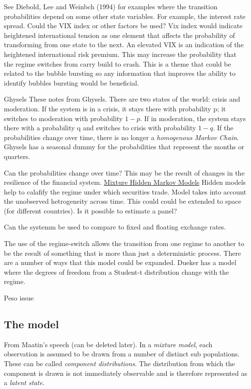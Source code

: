 \documentclass[12pt, a4paper, oneside]{article} %
\begin{document}
See Diebold, Lee and Weinbch (1994) for examples where the transition probabilities depend on some other state variables.  For example, the interest rate spread.   Could the VIX index or other factors be used?  Vix index would indicate heightened international tension as one element that affects the probability of transforming from one state to the next.  An elevated VIX is an indication of the heightened international risk premium.  This may increase the probability that the regime switches from carry build to crash.  This is a theme that could be related to the bubble bursting so any information that improves the ability to identify bubbles bursting would be beneficial.  


Ghysels
These notes from Ghysels.  There are two states of the world:  crisis and moderation.  If the system is in a crisis, it stays there with probability p; it switches to moderation with probability $1-p$.  If in moderation, the system stays there with a probability q and switches to crisis with probability $1-q$.  If the probabilities change over time, there is no longer a \emph{homogenous Markov Chain}. Ghysels has a seasonal dummy for the probabilities that represent the months or quarters.  

Can the probabilities change over time?  This may be the result of changes in the resilience of the financial system. 
\href{http://members.home.nl/jeroenvermunt/dias2010.pdf}{Mixture Hidden Markov Models} Hidden models help to calafify the regime under which securities trade. Model takes into account the unobserved hetrogeneity across time. This could could be extended to space (for different countries).  Is it possible to estimate a panel? 

Can the systemm be used to compare to fixed and floating exchange rates. 

The use of the regime-switch allows the transition from one regime to another to be the result of something that is more than just a deterministic process. There are a number of ways that this model could be expanded.  Dueker has a model where the degrees of freedom from a Student-t distribution change with the regime.  


Peso issue



\subsection{The model}

From Maatin's speech (can be deleted later).  In a \emph{mixture model}, each observation is assumed to be drawn from a number of distinct sub populations.  These can be called \emph{component distributions}.  The distribution from which the component is drawn is not immediately observable and is therefore represented as a \emph{latent state}. 
\end{document}
